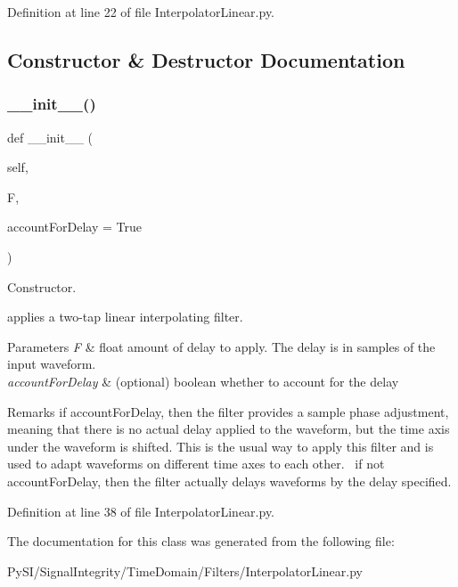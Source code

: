 Definition at line 22 of file Interpolator\+Linear.\+py.



\subsection{Constructor \& Destructor Documentation}
\mbox{\label{classSignalIntegrity_1_1TimeDomain_1_1Filters_1_1InterpolatorLinear_1_1FractionalDelayFilterLinear_a71162faa904c7ea2018b89ebba16c33d}} 
\subsubsection{\texorpdfstring{\+\_\+\+\_\+init\+\_\+\+\_\+()}{\_\_init\_\_()}}
{\footnotesize\ttfamily def \+\_\+\+\_\+init\+\_\+\+\_\+ (\begin{DoxyParamCaption}\item[{}]{self,  }\item[{}]{F,  }\item[{}]{account\+For\+Delay = {\ttfamily True} }\end{DoxyParamCaption})}



Constructor. 

applies a two-\/tap linear interpolating filter.


\begin{DoxyParams}{Parameters}
{\em F} & float amount of delay to apply. The delay is in samples of the input waveform. \\
\hline
{\em account\+For\+Delay} & (optional) boolean whether to account for the delay \\
\hline
\end{DoxyParams}
\begin{DoxyRemark}{Remarks}
if account\+For\+Delay, then the filter provides a sample phase adjustment, meaning that there is no actual delay applied to the waveform, but the time axis under the waveform is shifted. This is the usual way to apply this filter and is used to adapt waveforms on different time axes to each other.~\newline
 if not account\+For\+Delay, then the filter actually delays waveforms by the delay specified. 
\end{DoxyRemark}


Definition at line 38 of file Interpolator\+Linear.\+py.



The documentation for this class was generated from the following file\+:\begin{DoxyCompactItemize}
\item 
Py\+S\+I/\+Signal\+Integrity/\+Time\+Domain/\+Filters/Interpolator\+Linear.\+py\end{DoxyCompactItemize}
